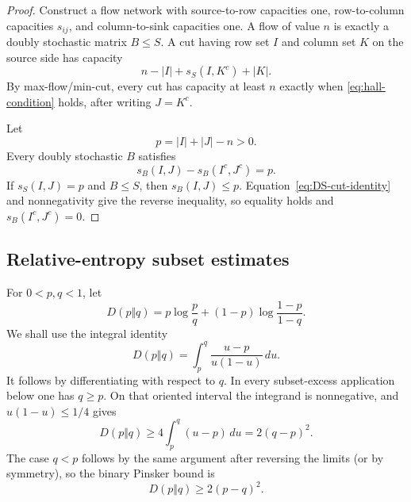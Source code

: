 \documentclass[11pt,a4paper]{article}
\numberwithin{equation}{section}
\theoremstyle{definition}
\newcommand{\1}{\mathbf{1}}
\begin{document}
\begin{proof}
Construct a flow network with source-to-row capacities one, row-to-column capacities $s_{ij}$, and column-to-sink capacities one.  A flow of value $n$ is exactly a doubly stochastic matrix $B\le S$.  A cut having row set $I$ and column set $K$ on the source side has capacity
\[
 n-|I|+s_S(I,K^c)+|K|.
\]
By max-flow/min-cut, every cut has capacity at least $n$ exactly when \eqref{eq:hall-condition} holds, after writing $J=K^c$.

Let
\[
 p=|I|+|J|-n>0.
\]
Every doubly stochastic $B$ satisfies
\begin{equation}\label{eq:DS-cut-identity}
 s_B(I,J)-s_B(I^c,J^c)=p.
\end{equation}
If $s_S(I,J)=p$ and $B\le S$, then $s_B(I,J)\le p$.  Equation~\eqref{eq:DS-cut-identity} and nonnegativity give the reverse inequality, so equality holds and $s_B(I^c,J^c)=0$.
\end{proof}

\subsection{Relative-entropy subset estimates}

For $0<p,q<1$, let
\[
 D(p\Vert q)=p\log\frac pq+(1-p)\log\frac{1-p}{1-q}.
\]
We shall use the integral identity
\begin{equation}\label{eq:KL-integral}
 D(p\Vert q)=\int_p^q\frac{u-p}{u(1-u)}\,du.
\end{equation}
It follows by differentiating with respect to $q$.  In every subset-excess
application below one has $q\ge p$.  On that oriented interval the integrand
is nonnegative, and $u(1-u)\le1/4$ gives
\[
 D(p\Vert q)\ge4\int_p^q(u-p)\,du=2(q-p)^2.
\]
The case $q<p$ follows by the same argument after reversing the limits (or
by symmetry), so the binary Pinsker bound is
\begin{equation}\label{eq:pinsker}
 D(p\Vert q)\ge2(p-q)^2.
\end{equation}
\end{document}
